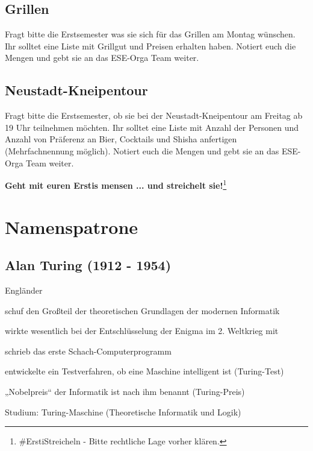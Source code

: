 \documentclass[a4paper,12pt]{report}
\begin{document}
\section{Grillen}
Fragt bitte die Erstsemester was sie sich für das Grillen am Montag wünschen. Ihr solltet eine Liste mit Grillgut und Preisen erhalten haben. Notiert euch die Mengen und gebt sie an das ESE-Orga Team weiter.

\section{Neustadt-Kneipentour}
Fragt bitte die Erstsemester, ob sie bei der Neustadt-Kneipentour am Freitag ab 19 Uhr teilnehmen möchten. Ihr solltet eine Liste mit Anzahl der Personen und Anzahl von Präferenz an Bier, Cocktails und Shisha anfertigen (Mehrfachnennung möglich). Notiert euch die Mengen und gebt sie an das ESE-Orga Team weiter.

\bigskip
\bigskip
\begin{center}
\huge{\textbf{Geht mit euren Erstis mensen ... und streichelt sie!}}\footnote[42]{\#ErstiStreicheln - Bitte rechtliche Lage vorher klären.}
\end{center}
\chapter{Namenspatrone}
\section*{Alan Turing (1912 - 1954)}
\begin{itemize*}
    \item Engländer
    \item schuf den Großteil der theoretischen Grundlagen der modernen Informatik
    \item wirkte wesentlich bei der Entschlüsselung der Enigma im 2. Weltkrieg mit
    \item schrieb das erste Schach-Computerprogramm
    \item entwickelte ein Testverfahren, ob eine Maschine intelligent ist (Turing-Test)
    \item „Nobelpreis“ der Informatik ist nach ihm benannt (Turing-Preis)
    \item Studium: Turing-Maschine (Theoretische Informatik und Logik)
\end{itemize*}
\end{document}
